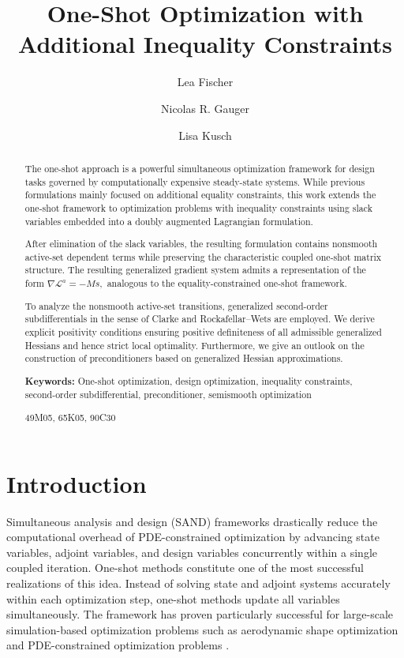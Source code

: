 \documentclass[11pt]{article}
\title{
One-Shot Optimization with Additional Inequality Constraints
}
\author[1]{Lea Fischer}
\author[2]{Nicolas R. Gauger}
\author[3]{Lisa Kusch}
\affil[1,2]{RPTU University Kaiserslautern-Landau, Kaiserslautern, Germany, nicolas.gauger(at)rptu.de}
\affil[3]{Eindhoven University of Technology, Eindhoven, The Netherlands, l.kusch(at)tue.nl}
\date{}
\newcommand{\DLag}{\mathcal L^a}
\begin{document}
\maketitle

\begin{abstract}

The one-shot approach is a powerful simultaneous optimization framework
for design tasks governed by computationally expensive steady-state
systems.
While previous formulations mainly focused on additional equality
constraints, this work extends the one-shot framework to optimization
problems with inequality constraints using slack variables embedded into
a doubly augmented Lagrangian formulation.

After elimination of the slack variables, the resulting formulation
contains nonsmooth active-set dependent terms while preserving the
characteristic coupled one-shot matrix structure.
The resulting generalized gradient system admits a representation of the
form
$
\nabla \DLag = -Ms,
$
analogous to the equality-constrained one-shot framework.

To analyze the nonsmooth active-set transitions, generalized second-order
subdifferentials in the sense of Clarke and Rockafellar--Wets are
employed.
We derive explicit positivity conditions ensuring positive definiteness of all admissible generalized Hessians and hence strict local optimality. %
Furthermore, we give an outlook on the construction of preconditioners based on generalized Hessian approximations.
\medskip

\textbf{Keywords:}
One-shot optimization, design optimization, inequality constraints, second-order subdifferential, preconditioner, semismooth optimization

\medskip

\noindent
49M05, 65K05, 90C30

\end{abstract}

\section{Introduction}
\label{intro}

Simultaneous analysis and design (SAND) frameworks drastically reduce
the computational overhead of PDE-constrained optimization by advancing
state variables, adjoint variables, and design variables concurrently
within a single coupled iteration. One-shot methods constitute one of the most successful realizations of
this idea.
Instead of solving state and adjoint systems accurately within each
optimization step, one-shot methods update all variables simultaneously. The framework has proven particularly successful for large-scale
simulation-based optimization problems such as aerodynamic shape
optimization and PDE-constrained optimization problems
\cite{hazra2005,gauger2008,bosse2014}.
\end{document}
